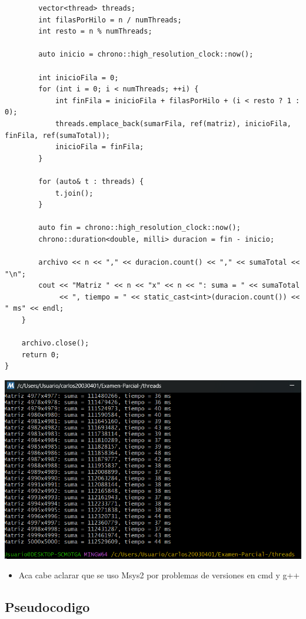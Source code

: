 \documentclass{article}
\begin{document}
\begin{lstlisting}
        vector<thread> threads;
        int filasPorHilo = n / numThreads;
        int resto = n % numThreads;

        auto inicio = chrono::high_resolution_clock::now();

        int inicioFila = 0;
        for (int i = 0; i < numThreads; ++i) {
            int finFila = inicioFila + filasPorHilo + (i < resto ? 1 : 0);
            threads.emplace_back(sumarFila, ref(matriz), inicioFila, finFila, ref(sumaTotal));
            inicioFila = finFila;
        }

        for (auto& t : threads) {
            t.join();
        }

        auto fin = chrono::high_resolution_clock::now();
        chrono::duration<double, milli> duracion = fin - inicio;

        archivo << n << "," << duracion.count() << "," << sumaTotal << "\n";
        cout << "Matriz " << n << "x" << n << ": suma = " << sumaTotal
             << ", tiempo = " << static_cast<int>(duracion.count()) << " ms" << endl;
    }

    archivo.close();
    return 0;
}

	\end{lstlisting}



 
        \includegraphics[width=1\textwidth]{img/resultado_2.png}


	\begin{itemize}	
		\item Aca cabe aclarar que se uso Msys2 por problemas de versiones en cmd y g++

	\end{itemize}

        
        
	\subsection{Pseudocodigo}
\end{document}
